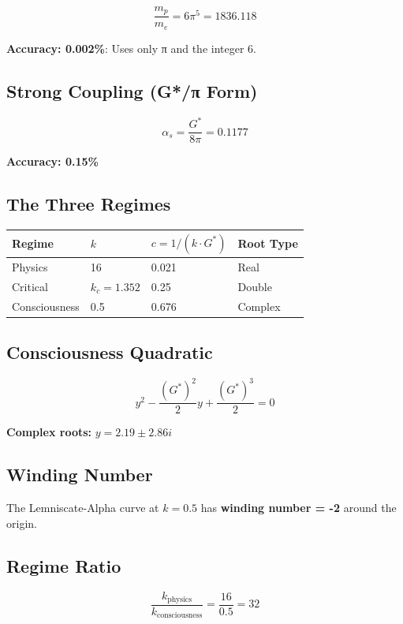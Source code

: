 \documentclass[
  11pt,
  letterpaper,
  twoside,
  openany]{book}
\makeatletter
\let\orig@subsection\subsection
\renewcommand{\subsection}{\needspace{6\baselineskip}\orig@subsection}
\makeatother
\begin{document}
\[
\frac{m_p}{m_e} = 6\pi^5 = 1836.118
\]

\textbf{Accuracy: 0.002\%}: Uses only π and the integer 6.

\subsection{Strong Coupling (G*/π
Form)}\label{strong-coupling-gux3c0-form}

\[
\alpha_s = \frac{G^*}{8\pi} = 0.1177
\]

\textbf{Accuracy: 0.15\%}

\subsection{The Three Regimes}\label{the-three-regimes}

\begin{longtable}[]{@{}llll@{}}
\toprule\noalign{}
Regime & \(k\) & \(c = 1/(k \cdot G^*)\) & Root Type \\
\midrule\noalign{}
\endhead
\bottomrule\noalign{}
\endlastfoot
Physics & 16 & 0.021 & Real \\
Critical & \(k_c = 1.352\) & 0.25 & Double \\
Consciousness & 0.5 & 0.676 & Complex \\
\end{longtable}

\subsection{Consciousness Quadratic}\label{consciousness-quadratic}

\[
y^2 - \frac{(G^*)^2}{2}y + \frac{(G^*)^3}{2} = 0
\]

\textbf{Complex roots:} \(y = 2.19 \pm 2.86i\)

\subsection{Winding Number}\label{winding-number}

The Lemniscate-Alpha curve at \(k = 0.5\) has \textbf{winding number =
-2} around the origin.

\subsection{Regime Ratio}\label{regime-ratio}

\[
\frac{k_{\text{physics}}}{k_{\text{consciousness}}} = \frac{16}{0.5} = 32
\]
\end{document}
